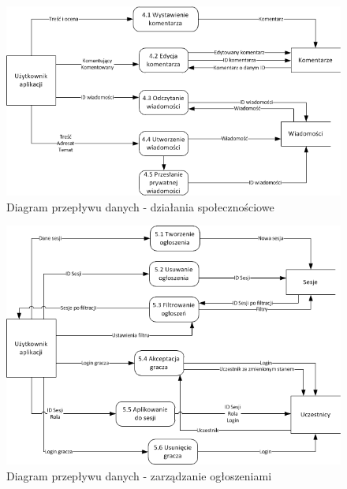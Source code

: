 \begin{figure}[h!]
\begin{center}
\centerline{\includegraphics[scale=1]{./img/DFD-social.png}}
\caption[Diagram przepływu danych]{Diagram przepływu danych - działania społecznościowe}
\label{fig:DFD-social}
\end{center}
\end{figure}

\begin{figure}[h!]
\begin{center}
\centerline{\includegraphics[scale=1]{./img/DFD-announcements.png}}
\caption[Diagram przepływu danych]{Diagram przepływu danych - zarządzanie ogłoszeniami}
\label{fig:DFD-announcements}
\end{center}
\end{figure}

